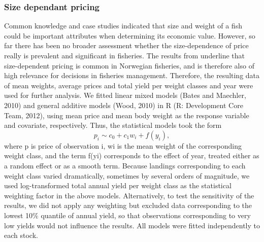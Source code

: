 \documentclass[12pt,oneline,a4paper,numbib]{ouparticle}
\numberwithin{equation}{subsection} %
\begin{document}
\subsubsection{Size dependant pricing}
\label{sec2.2.1}
Common knowledge and case studies indicated that size and weight of a fish could be important attributes when determining its economic value. However, so far there has been no broader assessment whether the size-dependence of price really is prevalent and significant in fisheries. The results from \cite{Zimmermann2011, Zimmermann2013} underline that size-dependent pricing is common in Norwegian fisheries, and is therefore also of high relevance for decisions in fisheries management. Therefore, the resulting data of mean weights, average prices and total yield per weight classes and year were used for further analysis. We fitted linear mixed models (Bates and Maechler, 2010) and general additive models (Wood, 2010) in R (R: Development Core Team, 2012), using mean price and mean body weight as the response variable and covariate, respectively. Thus, the statistical models took the form  
\begin{equation}
 p_{i} \sim c_{0} + c_{1} w_{i} + f (y_{i}), 
\end{equation}
where p is price of observation i, wi is the mean weight of the corresponding weight class, and the term f(yi) corresponds to the effect of year, treated either as a random effect or as a smooth term. Because landings corresponding to each weight class varied dramatically, sometimes by several orders of magnitude, we used log-transformed total annual yield per weight class as the statistical weighting factor in the above models. Alternatively, to test the sensitivity of the results, we did not apply any weighting but excluded data corresponding to the lowest 10\% quantile of annual yield, so that observations corresponding to very low yields would not influence the results. All models were fitted independently to each stock.
\begin{table}[!h]
\centering
\caption{Size dependant pricing.}
\label{t:pricing}
\end{table}
\end{document}
